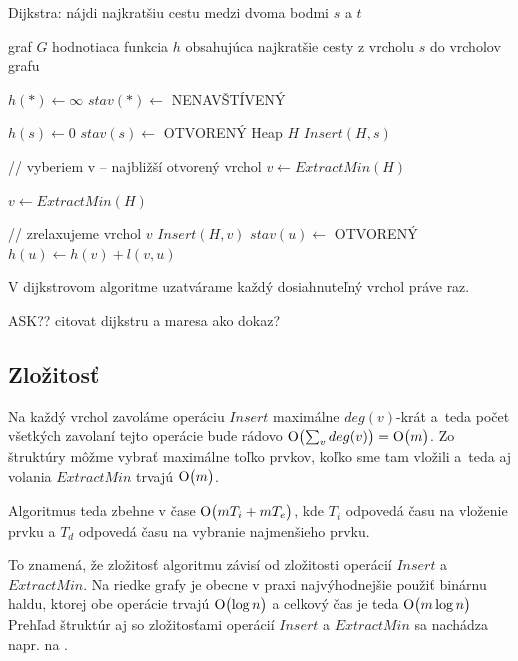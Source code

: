 \begin{algorithm}
\caption{Dijkstra: nájdi najkratšiu cestu medzi dvoma bodmi $s$ a $t$}
\label{alg:dijkstra}
\begin{algorithmic}[1] %
\REQUIRE graf $G$
\ENSURE hodnotiaca funkcia $h$ obsahujúca najkratšie cesty  z vrcholu $s$ do vrcholov grafu


\STATE $ h(*) \leftarrow \infty $
\STATE $ stav(*) \leftarrow$ NENAVŠTÍVENÝ

\STATE $h(s) \leftarrow 0$
\STATE $stav(s) \leftarrow $ OTVORENÝ
\STATE Heap $H$
\STATE $Insert(H, s)$

	
	\STATE // vyberiem v -- najbližší otvorený vrchol
	\STATE $v \leftarrow ExtractMin(H)$
	
		\STATE $v \leftarrow ExtractMin(H)$
	\ENDWHILE
	
	\STATE // zrelaxujeme vrchol $v$
			\STATE $Insert(H, v)$
			\STATE $stav(u) \leftarrow$ OTVORENÝ
			\STATE $h(u) \leftarrow h(v) + l(v, u)$
			
		\ENDIF
	\ENDFOR
\ENDWHILE

\end{algorithmic}
\end{algorithm}

\begin{theorem}
V dijkstrovom algoritme uzatvárame každý dosiahnuteľný vrchol práve raz.
\end{theorem}
ASK?? citovat dijkstru a maresa ako dokaz? 

\subsection{Zložitosť}
Na každý vrchol zavoláme operáciu $Insert$ maximálne $deg(v)$-krát a~teda počet všetkých zavolaní tejto operácie bude rádovo $\operatorname{O}\bigl(\sum_{v}{deg(v)}\bigr) = \operatorname{O}\bigl(m\bigr)$.
Zo štruktúry môžme vybrať maximálne toľko prvkov, koľko sme tam vložili a~teda aj volania $ExtractMin$ trvajú $\operatorname{O}\bigl(m\bigr)$.

Algoritmus teda zbehne v čase $\operatorname{O}\bigl(m T_i + m T_e\bigr)$, kde $T_i$ odpovedá času na vloženie prvku a $T_d$ odpovedá času na vybranie najmenšieho prvku.

To znamená, že zložitosť algoritmu závisí od zložitosti operácií $Insert$ a $ExtractMin$. Na riedke grafy je obecne v praxi najvýhodnejšie použiť 
binárnu haldu, ktorej obe operácie trvajú $\operatorname{O}\bigl(\log{n} \bigr) $ a celkový čas je teda $\operatorname{O}\bigl(m\log{n}\bigr)$
Prehľad štruktúr aj so zložitosťami operácií $Insert$ a $ExtractMin$ sa nachádza napr. na \cite{mares07}.

